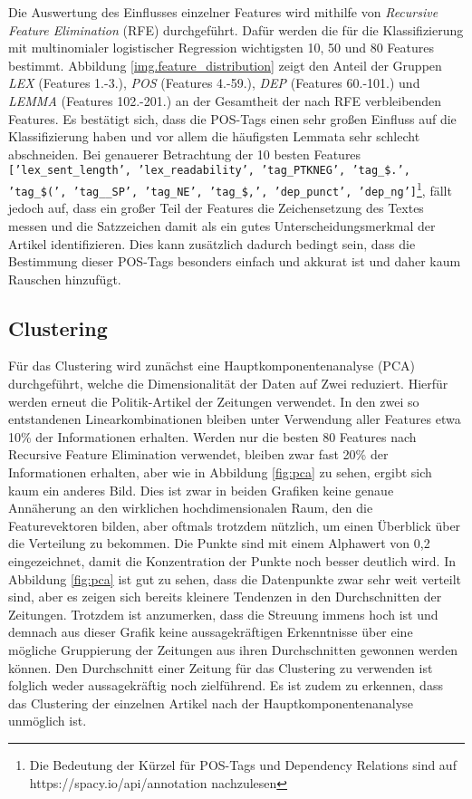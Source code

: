 
Die Auswertung des Einflusses einzelner Features wird mithilfe von \emph{Recursive Feature Elimination} (RFE) durchgeführt. Dafür werden die für die Klassifizierung mit multinomialer logistischer Regression wichtigsten 10, 50 und 80 Features bestimmt. Abbildung \ref{img.feature_distribution} zeigt den Anteil der Gruppen \textit{LEX} (Features 1.-3.), \textit{POS} (Features 4.-59.), \textit{DEP} (Features 60.-101.) und \textit{LEMMA} (Features 102.-201.) an der Gesamtheit der nach RFE verbleibenden Features. Es bestätigt sich, dass die POS-Tags einen sehr großen Einfluss auf die Klassifizierung haben und vor allem die häufigsten Lemmata sehr schlecht abschneiden. Bei genauerer Betrachtung der 10 besten Features \texttt{['lex\_sent\_length', 'lex\_readability', 'tag\_PTKNEG', 'tag\_\$.', 'tag\_\$(', 'tag\_\_SP', 'tag\_NE', 'tag\_\$,', 'dep\_punct', 'dep\_ng']}\footnote{Die Bedeutung der Kürzel für POS-Tags und Dependency Relations sind auf https://spacy.io/api/annotation nachzulesen}, \newline fällt jedoch auf, dass ein großer Teil der Features die Zeichensetzung des Textes messen und die Satzzeichen damit als ein gutes Unterscheidungsmerkmal der Artikel identifizieren. Dies kann zusätzlich dadurch bedingt sein, dass die Bestimmung dieser POS-Tags besonders einfach und akkurat ist und daher kaum Rauschen hinzufügt.

\subsection{Clustering}
Für das Clustering wird zunächst eine Hauptkomponentenanalyse (PCA) durchgeführt, welche die Dimensionalität der Daten auf Zwei reduziert. Hierfür werden erneut die Politik-Artikel der Zeitungen verwendet. In den zwei so entstandenen Linearkombinationen bleiben unter Verwendung aller Features etwa 10\% der Informationen erhalten. Werden nur die besten 80 Features nach Recursive Feature Elimination verwendet, bleiben zwar fast 20\% der Informationen erhalten, aber wie in Abbildung \ref{fig:pca} zu sehen, ergibt sich kaum ein anderes Bild. Dies ist zwar in beiden Grafiken keine genaue Annäherung an den wirklichen hochdimensionalen Raum, den die Featurevektoren bilden, aber oftmals trotzdem nützlich, um einen Überblick über die Verteilung zu bekommen. Die Punkte sind mit einem Alphawert von 0,2 eingezeichnet, damit die Konzentration der Punkte noch besser deutlich wird. In Abbildung \ref{fig:pca} ist gut zu sehen, dass die Datenpunkte zwar sehr weit verteilt sind, aber es zeigen sich bereits kleinere Tendenzen in den Durchschnitten der Zeitungen. Trotzdem ist anzumerken, dass die Streuung immens hoch ist und demnach aus dieser Grafik keine aussagekräftigen Erkenntnisse über eine mögliche Gruppierung der Zeitungen aus ihren Durchschnitten gewonnen werden können. Den Durchschnitt einer Zeitung für das Clustering zu verwenden ist folglich weder aussagekräftig noch zielführend. Es ist zudem zu erkennen, dass das Clustering der einzelnen Artikel nach der Hauptkomponentenanalyse unmöglich ist.

